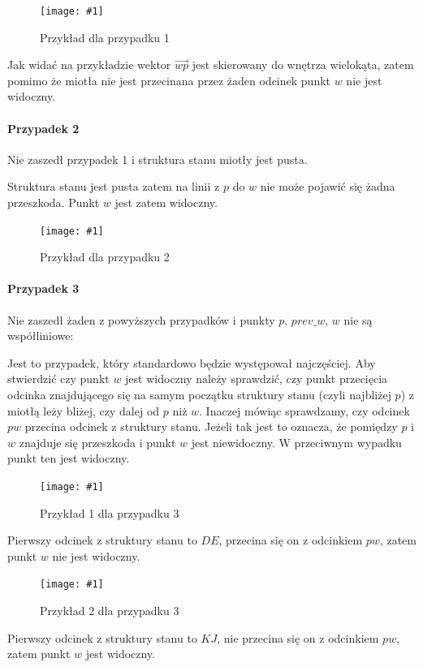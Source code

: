 \documentclass[12pt]{article}
\newcommand{\imgcustomsize}[3]{
	\begin{figure}[H]
		\centering
		\texttt{[image: \#1]}
		\caption{#2}
		\label{#1}
	\end{figure}
}
\newcommand{\img}[2]{\imgcustomsize{#1}{#2}{0.5}}
\begin{document}
			
			\img{przypadek1.jpg}{Przykład dla przypadku 1}
			
			Jak widać na przykładzie wektor $ \overrightarrow{wp} $ jest skierowany do wnętrza wielokąta, zatem pomimo że miotła nie jest przecinana przez żaden odcinek punkt $ w $ nie jest widoczny.
			
			\pagebreak
			\paragraph{Przypadek 2}
			Nie zaszedł przypadek 1 i struktura stanu miotły jest pusta.
			
			\vspace{\baselineskip} %
			Struktura stanu jest pusta zatem na linii z $ p $ do $ w $ nie może pojawić się żadna przeszkoda. Punkt $ w $ jest zatem widoczny.
			
			\img{przypadek2.jpg}{Przykład dla przypadku 2}
			
			\vspace{\baselineskip}

			\paragraph{Przypadek 3}
			Nie zaszedł żaden z powyższych przypadków i punkty $ p $, $ prev\_w $, $ w $ nie są współliniowe:
			
			\vspace{\baselineskip} %
			Jest to przypadek, który standardowo będzie występował najczęściej. Aby stwierdzić czy punkt $ w $ jest widoczny należy sprawdzić, czy punkt przecięcia odcinka znajdującego się na samym początku struktury stanu (czyli najbliżej $ p $) z miotłą leży bliżej, czy dalej od $ p $ niż $ w $. Inaczej mówiąc sprawdzamy, czy odcinek $ pw $ przecina odcinek z struktury stanu. Jeżeli tak jest to oznacza, że pomiędzy $ p $ i $ w $ znajduje się przeszkoda i punkt $ w $ jest niewidoczny. W przeciwnym wypadku punkt ten jest widoczny.
			
			\img{przypadek3.1.jpg}{Przykład 1 dla przypadku 3}
			
			Pierwszy odcinek z struktury stanu to $ DE $, przecina się on z odcinkiem $ pw $, zatem punkt $ w $ nie jest widoczny.
			
			\img{przypadek3.2.jpg}{Przykład 2 dla przypadku 3}
			
			Pierwszy odcinek z struktury stanu to $ KJ $, nie przecina się on z odcinkiem $ pw $, zatem punkt $ w $ jest widoczny.
			
\end{document}
